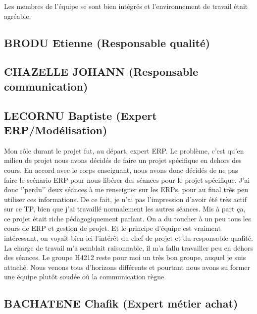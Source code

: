 Les membres de l'équipe se sont bien intégrés et l'environnement de travail était agréable.

       \subsection{BRODU Etienne (Responsable qualité)}

       \subsection{CHAZELLE JOHANN (Responsable communication)}

       \subsection{LECORNU Baptiste (Expert ERP/Modélisation)}
Mon rôle durant le projet fut, au départ, expert ERP. Le problème, c’est qu’en milieu de projet nous avons décidés de faire un projet spécifique en dehors des cours. En accord avec le corps enseignant, nous avons donc décidés de ne pas faire le scénario ERP pour nous libérer des séances pour le projet spécifique. J’ai donc ‘’perdu’’ deux séances à me renseigner sur les ERPs, pour au final très peu utiliser ces informations. De ce fait, je n’ai pas l’impression d’avoir été très actif sur ce TP, bien que j’ai travaillé normalement les autres séances. 
Mis à part ça, ce projet était riche pédagogiquement parlant. On a du toucher à un peu tous les cours de ERP et gestion de projet. Et le principe d’équipe est vraiment intéressant, on voyait bien ici l’intérêt du chef de projet et du responsable qualité.
La charge de travail m’a semblait raisonnable, il m’a fallu travailler peu en dehors des séances.
 Le groupe H4212 reste pour moi un très bon groupe, auquel je suis attaché. Nous venons tous d’horizons différents et pourtant nous avons su former une équipe plutôt soudée où la communication règne.

       \subsection{BACHATENE Chafik (Expert métier achat)}

